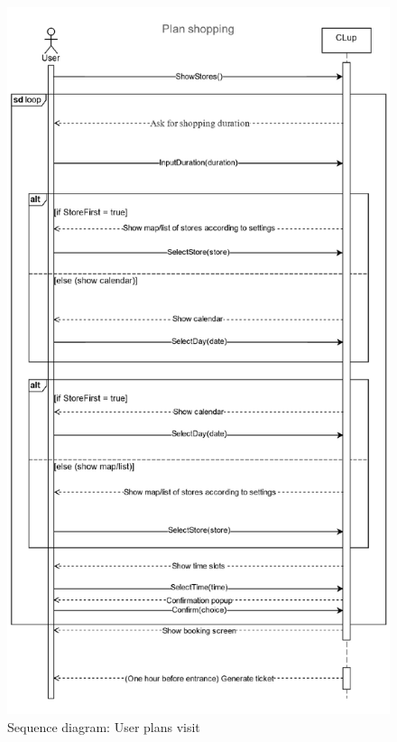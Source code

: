 \begin{figure}[H]
	\includegraphics[height=\textheight]{../Diagrams/PlanVisit.png}
	\caption{Sequence diagram: User plans visit}
	\label{fig:PlanVisit}
\end{figure} 

